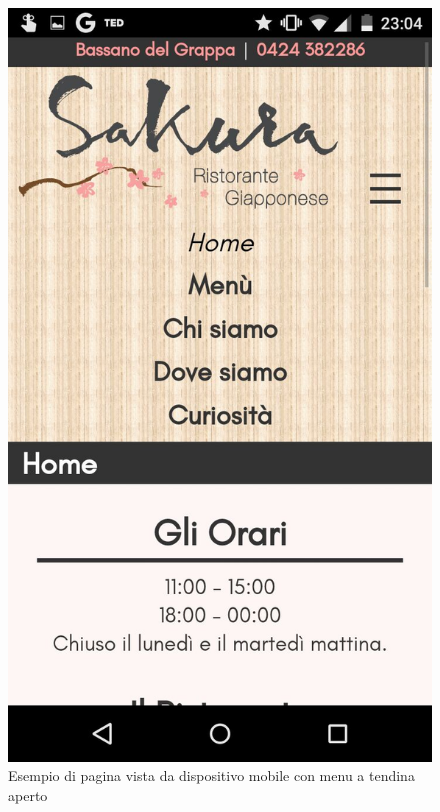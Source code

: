 \documentclass[../relazione.tex]{subfiles}
\begin{document}
	\begin{figure}[H]
		\centering
		\includegraphics[scale=0.2]{images/mobile2}
		\caption{Esempio di pagina vista da dispositivo mobile con menu a tendina aperto}
		\label{fig:Esempio di pagina vista da dispositivo mobile con menu a tendina aperto}
	\end{figure}
\end{document}
